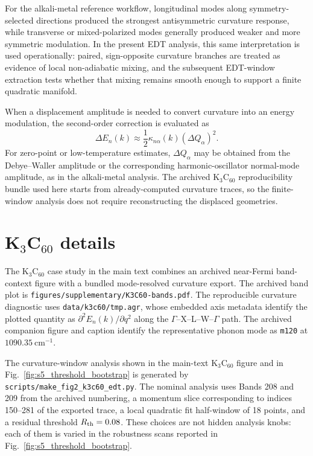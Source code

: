 ﻿\documentclass[aps,prx,reprint,superscriptaddress,longbibliography,floatfix]{revtex4-2}
\begin{document}
For the alkali-metal reference workflow, longitudinal modes along symmetry-selected directions produced the strongest antisymmetric curvature response, while transverse or mixed-polarized modes generally produced weaker and more symmetric modulation. In the present EDT analysis, this same interpretation is used operationally: paired, sign-opposite curvature branches are treated as evidence of local non-adiabatic mixing, and the subsequent EDT-window extraction tests whether that mixing remains smooth enough to support a finite quadratic manifold.

When a displacement amplitude is needed to convert curvature into an energy modulation, the second-order correction is evaluated as
\begin{equation}
\Delta E_n(k)
\approx
\frac{1}{2}\kappa_{n\alpha}(k)(\Delta Q_\alpha)^2 .
\end{equation}
For zero-point or low-temperature estimates, $\Delta Q_\alpha$ may be obtained from the Debye--Waller amplitude or the corresponding harmonic-oscillator normal-mode amplitude, as in the alkali-metal analysis. The archived K$_3$C$_{60}$ reproducibility bundle used here starts from already-computed curvature traces, so the finite-window analysis does not require reconstructing the displaced geometries.


\section{K$_3$C$_{60}$ details}

The K$_3$C$_{60}$ case study in the main text combines an archived near-Fermi band-context figure with a bundled mode-resolved curvature export. The archived band plot is \texttt{figures/supplementary/K3C60-bands.pdf}. The reproducible curvature diagnostic uses \texttt{data/k3c60/tmp.agr}, whose embedded axis metadata identify the plotted quantity as $\partial^2 E_n(k)/\partial q^2$ along the $\Gamma$--X--L--W--$\Gamma$ path. The archived companion figure and caption identify the representative phonon mode as \texttt{m120} at $1090.35~\mathrm{cm}^{-1}$.

The curvature-window analysis shown in the main-text K$_3$C$_{60}$ figure and in Fig.~\ref{fig:s5_threshold_bootstrap} is generated by \texttt{scripts/make\_fig2\_k3c60\_edt.py}. The nominal analysis uses Bands 208 and 209 from the archived numbering, a momentum slice corresponding to indices 150--281 of the exported trace, a local quadratic fit half-window of 18 points, and a residual threshold $R_{\rm th}=0.08$. These choices are not hidden analysis knobs: each of them is varied in the robustness scans reported in Fig.~\ref{fig:s5_threshold_bootstrap}.
\end{document}
